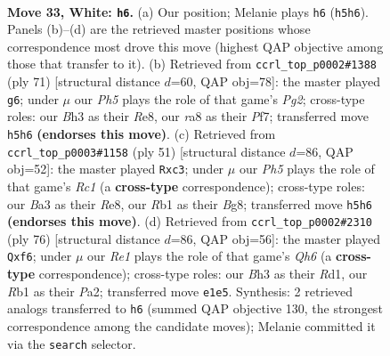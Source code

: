\documentclass[11pt]{article}
\begin{document}
\clearpage

\begin{figure}[p]\centering
\begin{subfigure}{0.46\textwidth}\centering
\resizebox{\linewidth}{!}{%
\newchessgame
\chessboard[
  setfen={r2r3k/bp1b1Qp1/p3p3/7P/8/BP1p3B/P2q1PKP/1R2R3 w - - 3 33},
  showmover=false,
  pgfstyle=straightmove, color=movearrow, markmove={h5-h6}
]}
\caption{}
\end{subfigure}\hfill
\begin{subfigure}{0.46\textwidth}\centering
\resizebox{\linewidth}{!}{%
\newchessgame
\chessboard[
  setfen={b2rr1k1/5pp1/7p/pp1PP3/3b4/qp1Q2BP/6P1/1BR1R2K b - - 2 36},
  showmover=false,
  pgfstyle=straightmove, color=movearrow, markmove={g7-g6}
]}
\caption{}
\end{subfigure}
\\[4pt]
\begin{subfigure}{0.46\textwidth}\centering
\resizebox{\linewidth}{!}{%
\newchessgame
\chessboard[
  setfen={2rqr1bk/p5bp/8/3p4/5BP1/P1PQ1P2/B4P2/R3R1K1 b - - 0 26},
  showmover=false,
  pgfstyle=straightmove, color=movearrow, markmove={c8-c3}
]}
\caption{}
\end{subfigure}\hfill
\begin{subfigure}{0.46\textwidth}\centering
\resizebox{\linewidth}{!}{%
\newchessgame
\chessboard[
  setfen={5rk1/1p1r3p/5q1Q/3bpP2/3p3P/6P1/P4RBK/3R4 w - - 0 39},
  showmover=false,
  pgfstyle=straightmove, color=movearrow, markmove={h6-f6}
]}
\caption{}
\end{subfigure}
\caption{\textbf{Move 33, White: \texttt{h6}.} (a) Our position; Melanie plays \texttt{h6} (\texttt{h5h6}). Panels (b)--(d) are the retrieved master positions whose correspondence most drove this move (highest QAP objective among those that transfer to it). (b) Retrieved from \texttt{ccrl\_top\_p0002\#1388} (ply 71) [structural distance $d$=60, QAP obj=78]: the master played \texttt{g6}; under $\mu$ our \emph{Ph5} plays the role of that game's \emph{Pg2}; cross-type roles: our \emph{B}h3 as their \emph{R}e8, our \emph{r}a8 as their \emph{P}f7; transferred move \texttt{h5h6} \textbf{(endorses this move)}. (c) Retrieved from \texttt{ccrl\_top\_p0003\#1158} (ply 51) [structural distance $d$=86, QAP obj=52]: the master played \texttt{Rxc3}; under $\mu$ our \emph{Ph5} plays the role of that game's \emph{Rc1} (a \textbf{cross-type} correspondence); cross-type roles: our \emph{B}a3 as their \emph{R}e8, our \emph{R}b1 as their \emph{B}g8; transferred move \texttt{h5h6} \textbf{(endorses this move)}. (d) Retrieved from \texttt{ccrl\_top\_p0002\#2310} (ply 76) [structural distance $d$=86, QAP obj=56]: the master played \texttt{Qxf6}; under $\mu$ our \emph{Re1} plays the role of that game's \emph{Qh6} (a \textbf{cross-type} correspondence); cross-type roles: our \emph{B}h3 as their \emph{R}d1, our \emph{R}b1 as their \emph{P}a2; transferred move \texttt{e1e5}. Synthesis: 2 retrieved analogs transferred to \texttt{h6} (summed QAP objective 130, the strongest correspondence among the candidate moves); Melanie committed it via the \texttt{search} selector.}
\label{fig:thought-m64}
\end{figure}
\end{document}
